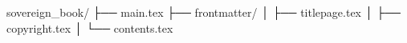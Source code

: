 sovereign_book/
├── main.tex
├── frontmatter/
│   ├── titlepage.tex
│   ├── copyright.tex
│   └── contents.tex